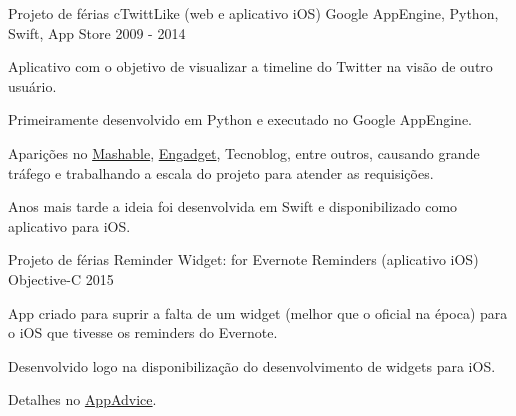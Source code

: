 

\begin{cventries}

\cventry
{Projeto de férias} %
{cTwittLike (web e aplicativo iOS)} %
{Google AppEngine, Python, Swift, App Store} %
{2009 - 2014} %
{
  \begin{cvitems} %
    \item {Aplicativo com o objetivo de visualizar a timeline do Twitter na visão de outro usuário.}
    \item {Primeiramente desenvolvido em Python e executado no Google AppEngine.}
    \item {Aparições no \href{https://mashable.com/archive/ctwitterlike}{Mashable}, \href{https://www.engadget.com/2014-10-08-view-someone-elses-own-twitter-timeline-with-ctwittlike.html}{Engadget}, Tecnoblog, entre outros, causando grande tráfego e trabalhando a escala do projeto para atender as requisições.}
    \item {Anos mais tarde a ideia foi desenvolvida em Swift e disponibilizado como aplicativo para iOS.}      
  \end{cvitems}
}


\cventry
{Projeto de férias} %
{Reminder Widget: for Evernote Reminders (aplicativo iOS)} %
{Objective-C} %
{2015} %
{
\begin{cvitems} %
  \item {App criado para suprir a falta de um widget (melhor que o oficial na época) para o iOS que tivesse os reminders do Evernote.}
  \item {Desenvolvido logo na disponibilização do desenvolvimento de widgets para iOS.}
  \item {Detalhes no \href{https://appadvice.com/app/reminder-widget-for-evernote-reminders/1000192150}{AppAdvice}.}
\end{cvitems}
}



\end{cventries}
